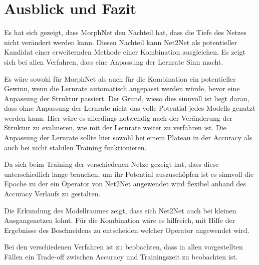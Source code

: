 
\chapter{Ausblick und Fazit}\label{sec:fazit}
Es hat sich gezeigt, dass MorphNet den Nachteil hat, dass die Tiefe des Netzes nicht verändert werden kann. Diesen Nachteil kann Net2Net als potentieller Kandidat einer erweiternden Methode einer Kombination ausgleichen. Es zeigt sich bei allen Verfahren, dass eine Anpassung der Lernrate Sinn macht. 

Es wäre sowohl für MorphNet als auch für die Kombination ein potentieller Gewinn, wenn die Lernrate automatisch angepasst werden würde, bevor eine Anpassung der Struktur passiert. Der Grund, wieso dies sinnvoll ist liegt daran, dass ohne Anpassung der Lernrate nicht das volle Potential jedes Modells genutzt werden kann. Hier wäre es allerdings notwendig nach der Veränderung der Struktur zu evaluieren, wie mit der Lernrate weiter zu verfahren ist. Die Anpassung der Lernrate sollte hier sowohl bei einem Plateau in der Accuracy als auch bei nicht stabilen Training funktionieren.


Da sich beim Training der verschiedenen Netze gezeigt hat, dass diese unterschiedlich lange brauchen, um ihr Potential auszuschöpfen ist es sinnvoll die Epoche zu der ein Operator von Net2Net angewendet wird flexibel anhand des Accuracy Verlaufs zu gestalten.  


Die Erkundung des Modellraumes zeigt, dass sich Net2Net auch bei kleinen Ausgangsnetzen lohnt. Für die Kombination wäre es hilfreich, mit Hilfe der Ergebnisse des Beschneidens zu entscheiden welcher Operator angewendet wird. 

Bei den verschiedenen Verfahren ist zu beobachten, dass in allen vorgestellten Fällen ein Trade-off zwischen Accuracy und Trainingszeit zu beobachten ist.
